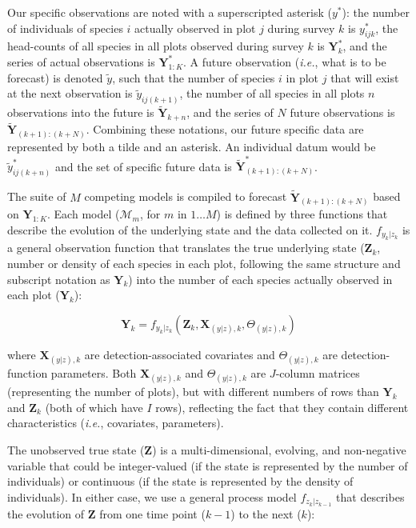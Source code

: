 \documentclass{article}
\begin{document}
Our specific observations are noted with a superscripted asterisk ($y^{*}$): the number of individuals of species $i$ actually observed in plot $j$ during survey $k$ is $y^{*}_{ijk}$, the head-counts of all species in all plots observed during survey $k$ is $\textbf{Y}^{*}_{k}$, and the series of actual observations is $\textbf{Y}^{*}_{1:K}$. A future observation (\emph{i.e.}, what is to be forecast) is denoted $\tilde{y}$, such that the number of species $i$ in plot $j$ that will exist at the next observation is $\tilde{y}_{ij(k+1)}$, the number of all species in all plots $n$ observations into the future is $\tilde{\textbf{Y}}_{k+n}$, and the series of $N$ future observations is $\tilde{\textbf{Y}}_{(k+1):(k+N)}$. Combining these notations, our future specific data are represented by both a tilde and an asterisk. An individual datum would be $\tilde{y}^{*}_{ij(k+n)}$ and the set of specific future data is $\tilde{\textbf{Y}}^{*}_{(k+1):(k+N)}$.

The suite of $M$ competing models is compiled to forecast $\tilde{\textbf{Y}}_{(k+1):(k+N)}$ based on $\textbf{Y}_{1:K}$. Each model ($\mathcal{M}_m$, for $m$ in $1 \ldots M$) is defined by three functions that describe the evolution of the underlying state and the data collected on it. $f_{y_k|z_k}$ is a general observation function that translates the true underlying state ($\textbf{Z}_k$, number or density of each species in each plot, following the same structure and subscript notation as $\textbf{Y}_k$) into the number of each species actually observed in each plot ($\textbf{Y}_k$):

\begin{equation}
\label{eq:1}
\textbf{Y}_k = f_{y_k|z_k}(\textbf{Z}_k, \textbf{X}_{(y|z), k}, \Theta_{(y|z), k})
\end{equation}

where $\textbf{X}_{(y|z), k}$ are detection-associated covariates and $\Theta_{(y|z), k}$ are detection-function parameters. Both $\textbf{X}_{(y|z), k}$ and $\Theta_{(y|z), k}$ are $J$-column matrices (representing the number of plots), but with different numbers of rows than $\textbf{Y}_k$ and $\textbf{Z}_k$ (both of which have $I$ rows), reflecting the fact that they contain different characteristics (\emph{i.e.}, covariates, parameters). 

The unobserved true state ($\textbf{Z}$) is a multi-dimensional, evolving, and non-negative variable that could be integer-valued (if the state is represented by the number of individuals) or continuous (if the state is represented by the density of individuals). In either case, we use a general process model $f_{z_k|z_{k-1}}$ that describes the evolution of $\textbf{Z}$ from one time point ($k-1$) to the next ($k$):
\end{document}
